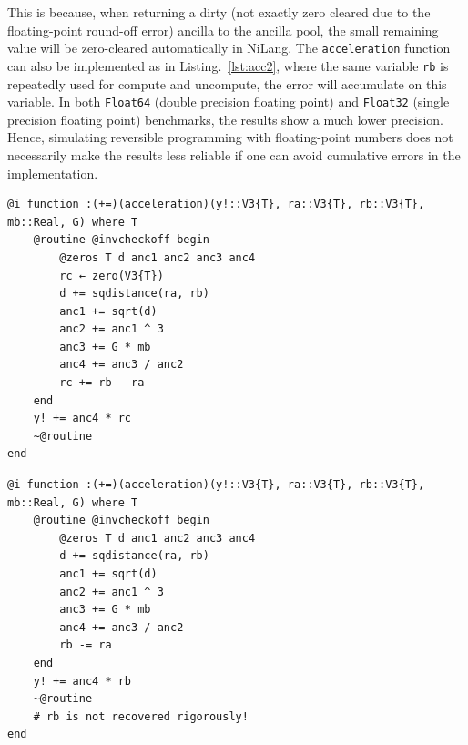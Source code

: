 \documentclass{article}
\newcommand{\<}{\langle}
\renewcommand{\>}{\rangle}
\newcommand{\Lst}[1]{Listing.~\ref{#1}}
\theoremstyle{definition}\newtheorem{definition}{\textit{Definition}}
\begin{document}
This is because, when returning a dirty (not exactly zero cleared due to the floating-point round-off error) ancilla to the ancilla pool, the small remaining value will be zero-cleared automatically in NiLang.
The \texttt{acceleration} function can also be implemented as in \Lst{lst:acc2}, where the same variable \texttt{rb} is repeatedly used for compute and uncompute, the error will accumulate on this variable.
In both \texttt{Float64} (double precision floating point) and \texttt{Float32} (single precision floating point) benchmarks, the results show a much lower precision.
Hence, simulating reversible programming with floating-point numbers does not necessarily make the results less reliable if one can avoid cumulative errors in the implementation.

\begin{minipage}{.45\textwidth}
    \begin{lstlisting}[mathescape=true,caption={Compute the acceleration. Compute and uncompute on ancilla \texttt{rc}},label={lst:acc1}, frame=tlrb]
@i function :(+=)(acceleration)(y!::V3{T}, ra::V3{T}, rb::V3{T}, mb::Real, G) where T
    @routine @invcheckoff begin
        @zeros T d anc1 anc2 anc3 anc4
        rc ← zero(V3{T})
        d += sqdistance(ra, rb)
        anc1 += sqrt(d)
        anc2 += anc1 ^ 3
        anc3 += G * mb
        anc4 += anc3 / anc2
        rc += rb - ra
    end
    y! += anc4 * rc
    ~@routine
end
\end{lstlisting}
\end{minipage}
\hfill
\begin{minipage}{.45\textwidth}
    \begin{lstlisting}[mathescape=true,caption={Compute the acceleration. Compute and uncompute on the input variable \texttt{rb}.},label={lst:acc2}, frame=tlrb]
@i function :(+=)(acceleration)(y!::V3{T}, ra::V3{T}, rb::V3{T}, mb::Real, G) where T
    @routine @invcheckoff begin
        @zeros T d anc1 anc2 anc3 anc4
        d += sqdistance(ra, rb)
        anc1 += sqrt(d)
        anc2 += anc1 ^ 3
        anc3 += G * mb
        anc4 += anc3 / anc2
        rb -= ra
    end
    y! += anc4 * rb
    ~@routine
    # rb is not recovered rigorously!
end
\end{lstlisting}
\end{minipage}
\end{document}
